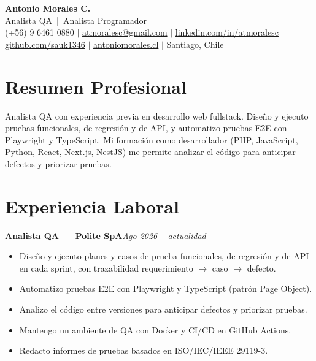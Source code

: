 \documentclass[10pt,a4paper]{article}
\newcommand{\entryheader}[3]{%
    \par\vspace{7pt}\textbf{#1}\hfill\textit{#2}\\[-8pt]
}
\begin{document}
\normalsize

\begin{center}
    {\LARGE \bfseries Antonio Morales C.}\\[6pt]
    {\large \color{darkgray} Analista QA \,|\, Analista Programador}\\[3pt]
    \small
    (+56) 9 6461 0880 \quad $\vert$ \quad
    \href{mailto:atmoralesc@gmail.com}{atmoralesc@gmail.com} \quad $\vert$ \quad
    \href{https://linkedin.com/in/atmoralesc}{linkedin.com/in/atmoralesc} \\[2pt]
    \href{https://github.com/sauk1346}{github.com/sauk1346} \quad $\vert$ \quad
    \href{https://antoniomorales.cl}{antoniomorales.cl} \quad $\vert$ \quad
    Santiago, Chile
\end{center}

\vspace{4pt}

\section{Resumen Profesional}
Analista QA con experiencia previa en desarrollo web fullstack. Diseño y ejecuto pruebas funcionales, de regresión y de API, y automatizo pruebas E2E con Playwright y TypeScript. Mi formación como desarrollador (PHP, JavaScript, Python, React, Next.js, NestJS) me permite analizar el código para anticipar defectos y priorizar pruebas.

\section{Experiencia Laboral}

\entryheader{Analista QA --- Polite SpA}{Ago 2026 -- actualidad}{}
\begin{itemize}
    \item Diseño y ejecuto planes y casos de prueba funcionales, de regresión y de API en cada sprint, con trazabilidad requerimiento $\rightarrow$ caso $\rightarrow$ defecto.
    \item Automatizo pruebas E2E con Playwright y TypeScript (patrón Page Object).
    \item Analizo el código entre versiones para anticipar defectos y priorizar pruebas.
    \item Mantengo un ambiente de QA con Docker y CI/CD en GitHub Actions.
    \item Redacto informes de pruebas basados en ISO/IEC/IEEE 29119-3.
\end{itemize}
\end{document}

